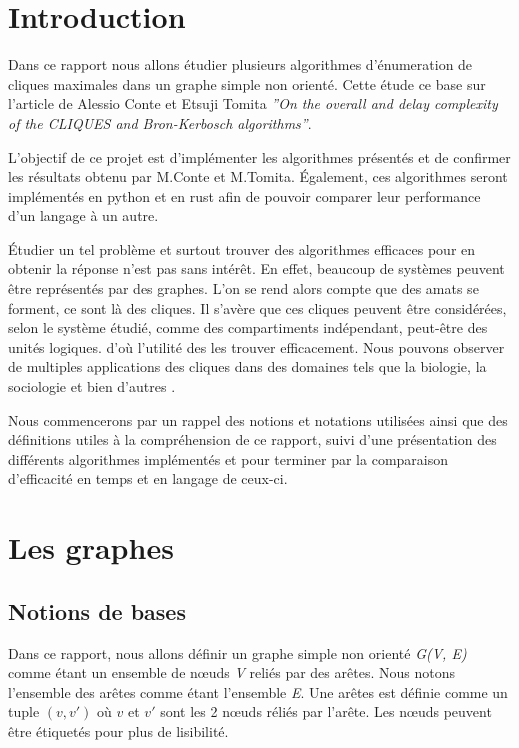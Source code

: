 \documentclass[12pt,a4paper]{report}
\begin{document}
\tableofcontents

\newpage

\section{Introduction}


Dans ce rapport nous allons étudier plusieurs algorithmes d'énumeration de cliques maximales dans un graphe simple non orienté. Cette étude ce base sur l'article de Alessio Conte et Etsuji Tomita  \textit{''On the overall and delay complexity of the CLIQUES and Bron-Kerbosch algorithms''}.

L'objectif de ce projet est d'implémenter les algorithmes présentés et de confirmer les résultats obtenu par M.Conte et M.Tomita. Également, ces algorithmes seront implémentés en python et en rust afin de pouvoir comparer leur performance d'un langage à un autre.

Étudier un tel problème et surtout trouver des algorithmes efficaces pour en obtenir la réponse n'est pas sans intérêt. En effet, beaucoup de systèmes peuvent être représentés par des graphes. L'on se rend alors compte que des amats se forment, ce sont là des cliques. Il s'avère que ces cliques peuvent être considérées, selon le système étudié, comme des compartiments indépendant, peut-être des unités logiques. d'où l'utilité des les trouver efficacement. Nous pouvons observer de multiples applications des cliques dans des domaines tels que la biologie, la sociologie et bien d'autres \cite{FORTUNATO201075}.

Nous commencerons par un rappel des notions et notations utilisées ainsi que des définitions utiles à la compréhension de ce rapport, suivi d'une présentation des différents algorithmes implémentés et pour terminer par la comparaison d'efficacité en temps et en langage de ceux-ci.

\section{Les graphes}%
\label{sec:graphes}

\subsection{Notions de bases}

Dans ce rapport, nous allons définir un graphe simple non orienté \emph{G(V, E)} comme étant un ensemble de nœuds \emph{V} reliés par des arêtes. Nous notons l'ensemble des arêtes comme étant l'ensemble \emph{E}. Une arêtes est définie comme un tuple $ (v, v') $ où $ v $ et $ v' $ sont les 2 nœuds réliés par l'arête. Les nœuds peuvent être étiquetés pour plus de lisibilité.
\end{document}
